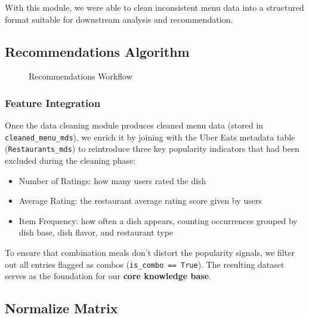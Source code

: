 \documentclass[
  11pt,
  a4paper,
  DIV=11,
  numbers=noendperiod]{scrartcl}
\providecommand{\tightlist}{%
  \setlength{\itemsep}{0pt}\setlength{\parskip}{0pt}}\usepackage{longtable,booktabs,array}
\begin{document}
With this module, we were able to clean inconsistent menu data into a
structured format suitable for downstream analysis and recommendation.

\subsection{Recommendations Algorithm}\label{recommendations-algorithm}

\begin{figure}

\caption{\label{fig-rec-flow}Recommendations Workflow}


\end{figure}%

\subsubsection{Feature Integration}\label{feature-integration}

Once the data cleaning module produces cleaned menu data (stored in
\texttt{cleaned\_menu\_mds}), we enrich it by joining with the Uber Eats
metadata table (\texttt{Restaurants\_mds}) to reintroduce three key
popularity indicators that had been excluded during the cleaning phase:

\begin{itemize}
\tightlist
\item
  Number of Ratings: how many users rated the dish
\item
  Average Rating: the restaurant average rating score given by users
\item
  Item Frequency: how often a dish appears, counting occurrences grouped
  by dish base, dish flavor, and restaurant type
\end{itemize}

To ensure that combination meals don't distort the popularity signals,
we filter out all entries flagged as combos
(\texttt{is\_combo\ ==\ True}). The resulting dataset serves as the
foundation for our \textbf{core knowledge base}.

\subsection{Normalize Matrix}\label{normalize-matrix}
\end{document}
